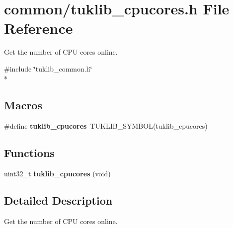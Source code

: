 \section{common/tuklib\-\_\-cpucores.h File Reference}
\label{tuklib__cpucores_8h}


Get the number of C\-P\-U cores online.  


{\ttfamily \#include \char`\"{}tuklib\-\_\-common.\-h\char`\"{}}\\*
\subsection*{Macros}
\begin{DoxyCompactItemize}
\item 
\#define {\bfseries tuklib\-\_\-cpucores}~T\-U\-K\-L\-I\-B\-\_\-\-S\-Y\-M\-B\-O\-L(tuklib\-\_\-cpucores)\label{tuklib__cpucores_8h_a27a9b6df2fabc7a8bf6dd06630da9843}

\end{DoxyCompactItemize}
\subsection*{Functions}
\begin{DoxyCompactItemize}
\item 
uint32\-\_\-t {\bfseries tuklib\-\_\-cpucores} (void)\label{tuklib__cpucores_8h_a29a46012d8b74be2f52214798c17dd79}

\end{DoxyCompactItemize}


\subsection{Detailed Description}
Get the number of C\-P\-U cores online. 
